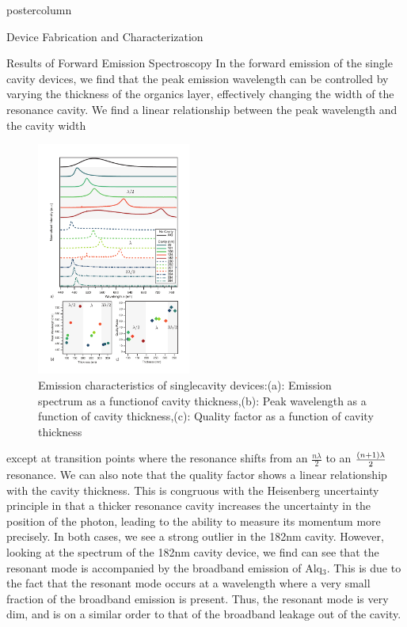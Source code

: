 \documentclass[papersize={24in,36in}]{beamer}
\begin{document}
\begin{frame}
\begin{columns}
\begin{column}{.49\textwidth}
\begin{beamercolorbox}[center,wd=\textwidth]{postercolumn}
\begin{minipage}[T]{.95\textwidth}
{\begin{block}{Device Fabrication and Characterization}
            \end{block}
			\vfill
            \begin{block}{Results of Forward Emission Spectroscopy}
			 	In the forward emission of the single cavity devices, we find that the peak emission wavelength can be controlled by varying the thickness of the organics layer, effectively changing the width of the resonance cavity. We find a linear relationship between the peak wavelength and the cavity width 
				\begin{figure}
					\includegraphics[width=0.45\textwidth]{images/F_N1FPPrelim.pdf}
					\caption{Emission characteristics of single\newline cavity devices:\newline (a): Emission spectrum as a function\newline of cavity thickness,\newline (b): Peak wavelength as a function of \newline cavity thickness,\newline (c): Quality factor as a function of cavity thickness}
				\end{figure}
				except at transition points where the resonance shifts from an $\frac{n\lambda}{2}$ to an $\frac{\qty(n+1)\lambda}{2}$ resonance. We can also note that the quality factor shows a linear relationship with the cavity thickness. This is congruous with the Heisenberg uncertainty principle in that a thicker resonance cavity increases the uncertainty in the position of the photon, leading to the ability to measure its momentum more precisely. In both cases, we see a strong outlier in the 182nm cavity. However, looking at the spectrum of the 182nm cavity device, we find can see that the resonant mode is accompanied by the broadband emission of Alq$_3$. This is due to the fact that the resonant mode occurs at a wavelength where a very small fraction of the broadband emission is present. Thus, the resonant mode is very dim, and is on a similar order to that of the broadband leakage out of the cavity.

\end{block}}
\end{minipage}
\end{beamercolorbox}
\end{column}
\end{columns}
\end{frame}
\end{document}
